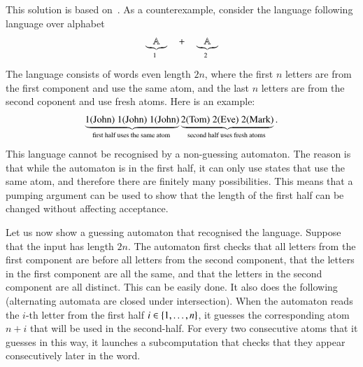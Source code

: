{
    This solution is based on~\cite[Section 2.3]{wysocki}.
    As a counterexample, consider the language following language over alphabet 
    \begin{align*}
    \myunderbrace{\atoms}{
        1
    }
    \quad + \quad
    \myunderbrace{\atoms}{
        2
    }
    \end{align*}
    The language consists of words even length $2n$, where the first $n$ letters are from the first component and use the same atom, and the last $n$ letters are from the second coponent and use fresh atoms. Here is an example: 
    \begin{align*}
\myunderbrace{    1(\text{John})\ 1(\text{John})\ 1(\text{John})}{first half uses the same atom}
   \myunderbrace{
    2(\text{Tom})\ 2(\text{Eve})\ 2(\text{Mark})
   }{second half uses fresh atoms}.
    \end{align*}
This language cannot be recognised by a non-guessing automaton. The reason is that while the automaton is in the first half, it can only use states that use the same atom, and therefore there are finitely many possibilities. This means that a pumping argument can be used to show that the length of the first half can be changed without affecting acceptance. 

Let us now show a guessing automaton that recognised the language. Suppose that the input has length $2n$. The automaton first checks that all letters from the first component are before all letters from the second component, that the letters in the first component are all the same, and that the letters in the second component are all distinct. This can be easily done. It also does the following (alternating automata are closed under intersection). When the automaton reads the $i$-th letter from the first half $i \in \{1,\ldots,n\}$, it guesses the corresponding atom $n+i$ that will be used in the second-half. For every two consecutive atoms that it guesses in this way, it launches a subcomputation that checks that they appear consecutively later in the word. 



}


